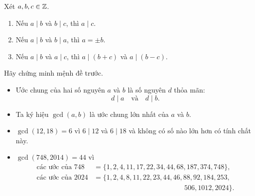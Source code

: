 \begin{frame}
  \begin{prpstn}
    Xét $a,b,c \in \mathbb{Z}$.
    \begin{enumerate}
    \item Nếu $a\mid b$ và $b\mid c$, thì $a\mid c$.
    \item Nếu $a\mid b$ và $b\mid a$, thì $a=\pm b$.
    \item Nếu $a \mid b$ và $a \mid c$, thì $a\mid (b + c)$ và $a\mid (b-c)$.
    \end{enumerate}
  \end{prpstn}
\end{frame}

\begin{frame}
  \begin{xrcs}
    Hãy chứng minh mệnh đề trước.
  \end{xrcs}
\end{frame}

\begin{frame}
  \begin{dfntn}
    \begin{itemize}
    \item Ước chung của hai số nguyên $a$ và $b$ là số nguyên $d$ thỏa
      mãn: $$d \mid a\quad \text{và}\quad  d\mid b.$$
    \item Ta ký hiệu $\gcd(a,b)$ là ước chung \alert{lớn nhất} của $a$ và $b$.
    \end{itemize}
  \end{dfntn}
\pause 
  \begin{xmpl}
    \begin{itemize}
    \item $\gcd(12,18) = 6$ vì $6\mid 12$ và $6\mid 18$ và không có số nào lớn hơn có tính chất này.
    \item $\gcd(748,2014) = 44$ vì 
      \begin{align*}
        \text{các ước của } 748 &= \{1, 2, 4, 11, 17, 22, 34, 44, 68, 187, 374, 748\},\\
        \text{các ước của } 2024 &=\{1, 2, 4, 8, 11, 22, 23, 44, 46, 88, 92, 184, 253,\\
 &\qquad\qquad \qquad \qquad \qquad \qquad\quad      506, 1012, 2024\}.
      \end{align*}
    \end{itemize}

\vspace{-0.5cm}

  \end{xmpl}
\end{frame}

